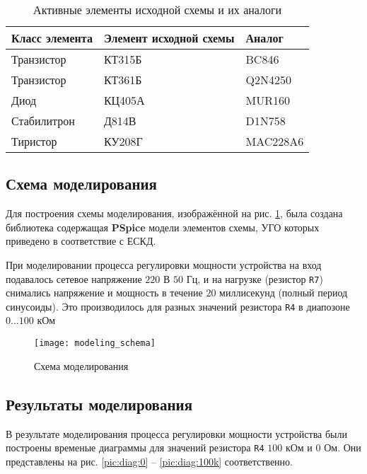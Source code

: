 \begin{table}[H]
\begin{center}
	\caption{Активные элементы исходной схемы и их аналоги}
	\label{tab:elements_analogs}
	\def\tabcolsep{10pt}
	\begin{tabular}{|l|l|l|}
		\hline
		Класс элемента &
		Элемент исходной схемы & 
		Аналог \\
		\hline
		Транзистор &
		КТ315Б &
		BC846 \\
		\hline
		Транзистор &
		КТ361Б &
		Q2N4250 \\
		\hline
		Диод &
		КЦ405А &
		MUR160 \\
		\hline
		Стабилитрон &
		Д814В &
		D1N758 \\
		\hline
		Тиристор &
		КУ208Г &
		MAC228A6 \\
		\hline
\end{tabular}
\end{center}
\end{table}

\subsection{Схема моделирования}

Для построения схемы моделирования, изображённой на рис. \ref{pic:mod_scheme}, была создана библиотека содержащая \textbf{PSpice} модели элементов схемы, УГО которых приведено  в соответствие с ЕСКД. 

При моделировании процесса регулировки мощности устройства на вход подавалось сетевое напряжение $220$ В $50$ Гц, и на нагрузке (резистор \verb+R7+) снимались напряжение и мощность в течение $20$ миллисекунд (полный период синусоиды). Это производилось для разных значений резистора \verb+R4+ в диапозоне $0\dots100$ кОм

\begin{figure}[H]
\begin{center}
	\texttt{[image: modeling\_schema]}
	\caption{Схема моделирования}
	\label{pic:mod_scheme}
\end{center}
\end{figure}

\subsection{Результаты моделирования}

В результате моделирования процесса регулировки мощности устройства были построены временые диаграммы для значений резистора \verb+R4+ $100$ кОм и $0$ Ом. Они представлены на рис. \ref{pic:diag:0} -- \ref{pic:diag:100k} соответственно.

